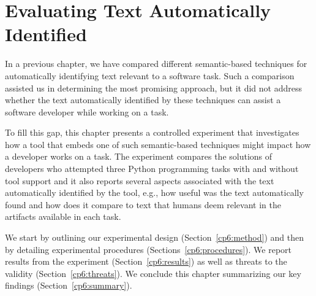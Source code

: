 \setcounter{chapter}{5}
\setcounter{rq}{1}


\chapter{Evaluating Text Automatically Identified}
\label{ch:assisting}




In a previous chapter, we have compared different semantic-based techniques for automatically identifying text relevant to a software task.
Such a comparison assisted us in determining the most promising approach, but it did not address whether 
the text automatically identified  
by these techniques can assist a software developer while working on a task.



To fill this gap, this chapter presents a controlled experiment that 
investigates how a tool that embeds one of such semantic-based techniques 
might impact how a developer works on a task. 
The experiment 
compares the solutions of developers who attempted three Python programming tasks with and without tool support
and it also reports several aspects associated with the text automatically identified by the tool,
e.g., how useful was the text automatically found and how does it compare to text that humans deem relevant
in the artifacts available in each task.





We start by outlining our experimental design (Section~\ref{cp6:method}) and then 
by detailing experimental procedures (Sections~\ref{cp6:procedures}).
We report results from the experiment (Section~\ref{cp6:results})
as well as threats to the validity (Section~\ref{cp6:threats}).
We conclude this chapter summarizing our key findings (Section~\ref{cp6:summary}).


\clearpage






















% 

